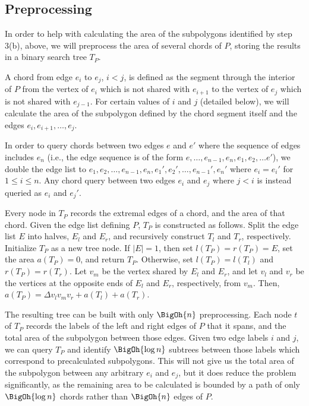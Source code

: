 \subsection{Preprocessing}
\label{:convexp:preprocessing}

In order to help with calculating the area of the subpolygons identified by step 3(b), above, we will preprocess the area of several chords of $P$, storing the results in a binary search tree $T_P$. 

A chord from edge $e_i$ to $e_j$, $i < j$, is defined as the segment through the interior of $P$ from the vertex of $e_i$ which is not shared with $e_{i+1}$ to the vertex of $e_j$ which is not shared with $e_{j-1}$.
For certain values of $i$ and $j$ (detailed below), we will calculate the area of the subpolygon defined by the chord segment itself and the edges $e_i, e_{i+1}, \ldots, e_j$.

In order to query chords between two edges $e$ and $e'$ where the sequence of edges includes $e_n$ (i.e., the edge sequence is of the form $e, \ldots, e_{n-1}, e_{n}, e_{1}, e_{2}, \ldots e'$), we double the edge list to $e_1, e_2, \ldots, e_{n-1}, e_{n}, e_{1}', e_{2}', \ldots, e_{n-1}', e_n'$ where $e_i = e_i'$ for $1 \leq i \leq n$.
Any chord query between two edges $e_i$ and $e_j$ where $j < i$ is instead queried as $e_i$ and $e_j'$.

Every node in $T_P$ records the extremal edges of a chord, and the area of that chord. Given the edge list defining $P$, $T_P$ is constructed as follows. 
Split the edge list $E$ into halves, $E_l$ and $E_r$, and recursively construct $T_l$ and $T_r$, respectively. Initialize $T_P$ as a new tree node. If $|E| = 1$, then set $l(T_P) = r(T_P) = E$, set the area $a(T_P) = 0$, and return $T_P$. Otherwise, set $l(T_P) = l(T_l)$ and $r(T_P) = r(T_r)$. 
Let $v_m$ be the vertex shared by $E_l$ and $E_r$, and let $v_l$ and $v_r$ be the vertices at the opposite ends of $E_l$ and $E_r$, respectively, from $v_m$. Then, $a(T_P) = \Delta v_l v_m v_r + a(T_l) + a(T_r)$.

The resulting tree can be built with only $\BigOh{n}$ preprocessing.
Each node $t$ of $T_P$ records the labels of the left and right edges of $P$ that it spans, and the total area of the subpolygon between those edges.
Given two edge labels $i$ and $j$, we can query $T_P$ and identify $\BigOh{\log{n}}$ subtrees between those labels which correspond to precalculated subpolygons.
This will not give us the total area of the subpolygon between any arbitrary $e_i$ and $e_j$, but it does reduce the problem significantly, as the remaining area to be calculated is bounded by a path of only $\BigOh{\log{n}}$ chords rather than $\BigOh{n}$ edges of $P$.

